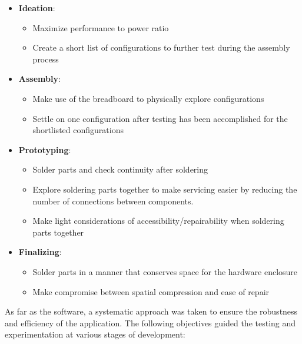 \documentclass[conference]{IEEEtran}
\begin{document}
\begin{itemize}
      \item \textbf{Ideation}:
            \begin{itemize}
                  \item Maximize performance to power ratio
                  \item Create a short list of configurations to further test
                        during the assembly process
            \end{itemize}
      \item \textbf{Assembly}:
            \begin{itemize}
                  \item Make use of the breadboard to physically explore configurations
                  \item Settle on one configuration after testing has been
                        accomplished for the shortlisted configurations
            \end{itemize}
      \item \textbf{Prototyping}:
            \begin{itemize}
                  \item Solder parts and check continuity after soldering
                  \item Explore soldering parts together to make servicing easier
                        by reducing the number of connections between components.
                  \item Make light considerations of accessibility/repairability when soldering parts together
            \end{itemize}
      \item \textbf{Finalizing}:
            \begin{itemize}
                  \item Solder parts in a manner that conserves space for the hardware enclosure
                  \item Make compromise between spatial compression and ease of repair
            \end{itemize}
\end{itemize}

As far as the software, a systematic approach was taken to ensure the
robustness and efficiency of the application.
The following objectives guided the testing and experimentation at various stages of development:
\end{document}
